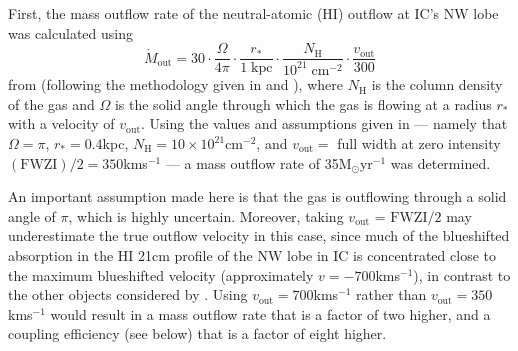 First, the mass outflow rate of the neutral-atomic (HI) outflow at IC's NW lobe was calculated using
\begin{equation}
    \dot{M}_\mathrm{out} = 30\cdot\frac{\Omega}{4\pi}\cdot\frac{r_\ast}{1\;\mathrm{kpc}}\cdot\frac{N_\mathrm{H}}{10^{21}\;\mathrm{cm}^{-2}}\cdot\frac{v_\mathrm{out}}{300}
\label{eq: xshooter_ic5063: appendix_hi_mout}
\end{equation}
from \citet{Morganti2005} (following the methodology given in \citealt{Heckman2002} and \citealt{Rupke2002}), where $N_\mathrm{H}$ is the column density of the gas and $\Omega$ is the solid angle through which the gas is flowing at a radius $r_\ast$ with a velocity of $v_\mathrm{out}$. Using the values and assumptions given in \citet{Morganti2005} --- namely that \mbox{$\Omega=\pi$}, \mbox{$r_\ast=0.4$\;kpc}, $N_\mathrm{H}=10\times10^{21}$\;cm$^{-2}$, and $v_\mathrm{out}=$ full width at zero intensity $\mathrm{(FWZI)}/2=350$\;km\;s$^{-1}$ --- a mass outflow rate of 35\;M$_\odot$\;yr$^{-1}$ was determined.

An important assumption made here is that the gas is outflowing through a solid angle of $\pi$, which is highly uncertain. Moreover, taking $v_\mathrm{out}$ = $\mathrm{FWZI}/2$ may underestimate the true outflow velocity in this case, since much of the blueshifted absorption in the HI 21\;cm profile of the NW lobe in IC is concentrated close to the maximum blueshifted velocity (approximately $v=-700$\;km\;s$^{-1}$), in contrast to the other objects considered by \citet{Morganti2005}. Using $v_\mathrm{out}=700$\;km\;s$^{-1}$ rather than $v_\mathrm{out}=350$\;km\;s$^{-1}$ would result in a mass outflow rate that is a factor of two higher, and a coupling efficiency (see below) that is a factor of eight higher.

